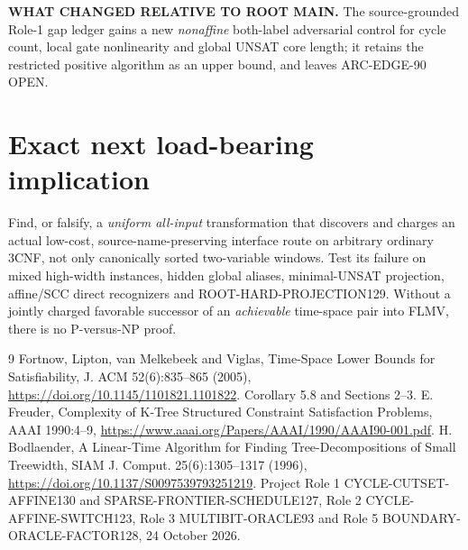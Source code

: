 \documentclass[11pt]{article}
\begin{document}
\textbf{WHAT CHANGED RELATIVE TO ROOT MAIN.} The source-grounded Role-1 gap ledger gains a new \emph{nonaffine} both-label adversarial control for cycle count, local gate nonlinearity and global UNSAT core length; it retains the restricted positive algorithm as an upper bound, and leaves ARC-EDGE-90 OPEN.

\section{Exact next load-bearing implication}
Find, or falsify, a \emph{uniform all-input} transformation that discovers and charges an actual low-cost, source-name-preserving interface route on arbitrary ordinary 3CNF, not only canonically sorted two-variable windows. Test its failure on mixed high-width instances, hidden global aliases, minimal-UNSAT projection, affine/SCC direct recognizers and ROOT-HARD-PROJECTION129. Without a jointly charged favorable successor of an \emph{achievable} time-space pair into FLMV, there is no P-versus-NP proof.

\begin{thebibliography}{9}
 Fortnow, Lipton, van Melkebeek and Viglas, Time-Space Lower Bounds for Satisfiability, J. ACM 52(6):835--865 (2005), \url{https://doi.org/10.1145/1101821.1101822}. Corollary 5.8 and Sections 2--3.
 E. Freuder, Complexity of K-Tree Structured Constraint Satisfaction Problems, AAAI 1990:4--9, \url{https://www.aaai.org/Papers/AAAI/1990/AAAI90-001.pdf}.
 H. Bodlaender, A Linear-Time Algorithm for Finding Tree-Decompositions of Small Treewidth, SIAM J. Comput. 25(6):1305--1317 (1996), \url{https://doi.org/10.1137/S0097539793251219}.
 Project Role 1 CYCLE-CUTSET-AFFINE130 and SPARSE-FRONTIER-SCHEDULE127, Role 2 CYCLE-AFFINE-SWITCH123, Role 3 MULTIBIT-ORACLE93 and Role 5 BOUNDARY-ORACLE-FACTOR128, 24 October 2026.
\end{thebibliography}
\end{document}
